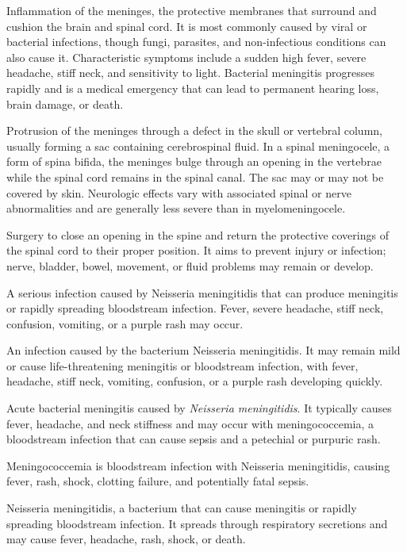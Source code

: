  Inflammation of the meninges, the protective membranes that surround and cushion the brain and spinal cord. It is most commonly caused by viral or bacterial infections, though fungi, parasites, and non-infectious conditions can also cause it. Characteristic symptoms include a sudden high fever, severe headache, stiff neck, and sensitivity to light. Bacterial meningitis progresses rapidly and is a medical emergency that can lead to permanent hearing loss, brain damage, or death.

 Protrusion of the meninges through a defect in the skull or vertebral column, usually forming a sac containing cerebrospinal fluid.
In a spinal meningocele, a form of spina bifida, the meninges bulge through an opening in the vertebrae while the spinal
cord remains in the spinal canal. The sac may or may not be covered by skin. Neurologic effects vary with associated
spinal or nerve abnormalities and are generally less severe than in myelomeningocele.

 Surgery to close an opening in the spine and return the protective coverings of the spinal cord to their proper position. It aims to prevent injury or infection; nerve, bladder, bowel, movement, or fluid problems may remain or develop.

 A serious infection caused by Neisseria meningitidis that can produce meningitis or rapidly spreading bloodstream infection. Fever, severe headache, stiff neck, confusion, vomiting, or a purple rash may occur.

 An infection caused by the bacterium Neisseria meningitidis. It may remain mild or cause life-threatening meningitis or bloodstream infection, with fever, headache, stiff neck, vomiting, confusion, or a purple rash developing quickly.

 Acute bacterial meningitis caused by \textit{Neisseria meningitidis}. It typically causes fever, headache, and neck stiffness and may occur with meningococcemia, a bloodstream infection that can cause sepsis and a petechial or purpuric rash.

 Meningococcemia is bloodstream infection with Neisseria meningitidis, causing fever, rash, shock, clotting failure, and potentially fatal sepsis.

 Neisseria meningitidis, a bacterium that can cause meningitis or rapidly spreading bloodstream infection. It spreads through respiratory secretions and may cause fever, headache, rash, shock, or death.

